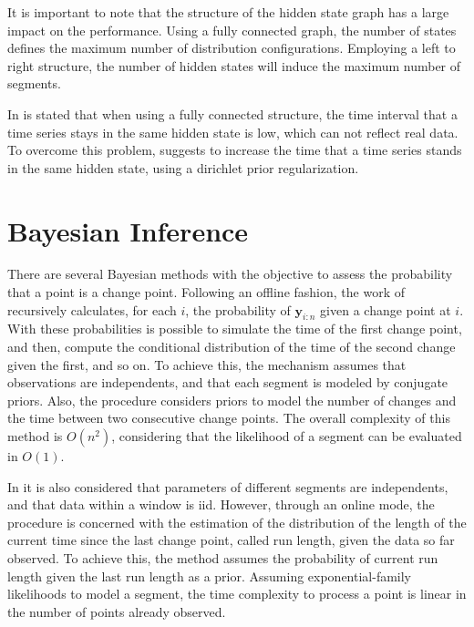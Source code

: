 It is important to note that the structure of the hidden state graph has a large impact on the performance. Using a fully connected graph, the number of states defines the maximum number of distribution configurations. Employing a left to right structure, the number of hidden states will induce the maximum number of segments.

In \cite{inertial_hidden_markov_models_modeling_change_in_multivariate_time_series} is stated that when using a fully connected structure, the time interval that a time series stays in the same hidden state is low, which can not reflect real data. To overcome this problem, \cite{inertial_hidden_markov_models_modeling_change_in_multivariate_time_series} suggests to increase the time that a time series stands in the same hidden state, using a dirichlet prior regularization.

\section{Bayesian Inference}

There are several Bayesian methods with the objective to assess the probability that a point is a change point. Following an offline fashion, the work of \cite{exact_and_efficient_bayesian_inference_for_multiple_changepoint_problems} recursively calculates, for each $i$, the probability of $\mathbf{y}_{i : n}$ given a change point at $i$. With these probabilities is possible to simulate the time of the first change point, and then, compute the conditional distribution of the time of the second change given the first, and so on. To achieve this, the mechanism assumes that observations are independents, and that each segment is modeled by conjugate priors. Also, the procedure considers priors to model the number of changes and the time between two consecutive change points. The overall complexity of this method is $O(n^{2})$, considering that the likelihood of a segment can be evaluated in $O(1)$.

In \cite{bayesian_online_changepoint_detection} it is also considered that parameters of different segments are independents, and that data within a window is iid. However, through an online mode, the procedure is concerned with the estimation of the distribution of the length of the current time since the last change point, called run length, given the data so far observed. To achieve this, the method assumes the probability of current run length given the last run length as a prior. Assuming exponential-family likelihoods to model a segment, the time complexity to process a point is linear in the number of points already observed. 
